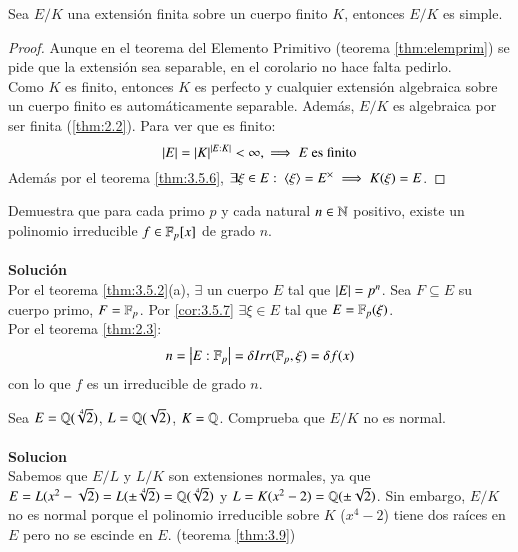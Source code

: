\begin{cor}\label{cor:3.5.7}
    Sea $E/K$ una extensión finita sobre un cuerpo finito $K$, entonces $E/K$ es simple.
\end{cor}
\begin{proof}
    Aunque en el teorema del Elemento Primitivo (teorema \ref{thm:elemprim}) se pide que la extensión sea separable, en el corolario no hace falta pedirlo.\\
    Como $K$ es finito, entonces $K$ es perfecto y cualquier extensión algebraica sobre un cuerpo finito es automáticamente separable. Además, $E/K$ es algebraica por ser finita (\ref{thm:2.2}). Para ver que es finito:
    $$
        \left|E\right| = \left|K\right|^{\left|E:K\right|} < \infty, \implies E \text{ es finito}
    $$
    Además por el teorema \ref{thm:3.5.6}, $\exists \xi \in E:\ \langle\xi\rangle = E^\times \implies K(\xi) = E$.
\end{proof}

\begin{ex}[H3.19]
    Demuestra que para cada primo $p$ y cada natural $n \in \mathbb{N}$ positivo, existe un polinomio irreducible $f \in \mathbb{F}_p[x]$ de grado $n$.\\\\
    \textbf{Solución}\\
    Por el teorema \ref{thm:3.5.2}(a), $\exists$ un cuerpo $E$ tal que $\left|E\right| = p^n$.
    Sea $F \subseteq E$ su cuerpo primo, $F = \mathbb{F}_p$. Por \ref{cor:3.5.7} $\exists \xi \in E$ tal que $E = \mathbb{F}_p(\xi)$.\\
    Por el teorema \ref{thm:2.3}:
    $$
        n = \left|E:\mathbb{F}_p\right| = \delta Irr(\mathbb{F}_p, \xi) = \delta f(x)
    $$
    con lo que $f$ es un irreducible de grado $n$.
\end{ex}

\begin{ex}[H3.9]
    Sea $E = \mathbb{Q}(\sqrt[4]{2})$, $L = \mathbb{Q}(\sqrt 2)$, $K = \mathbb{Q}$. Comprueba que $E/K$ no es normal.\\\\

    \textbf{Solucion}\\
    Sabemos que $E/L$ y $L/K$ son extensiones normales, ya que $E = L(x^2-\sqrt{2}) = L(\pm \sqrt[4]{2}) = \mathbb{Q}(\sqrt[4]{2})$ y $L = K(x^2-2) = \mathbb{Q}(\pm \sqrt{2})$. Sin embargo, $E/K$ no es normal porque el polinomio irreducible sobre $K$ ($x^4-2$) tiene dos raíces en $E$ pero no se escinde en $E$. (teorema \ref{thm:3.9})
\end{ex}


